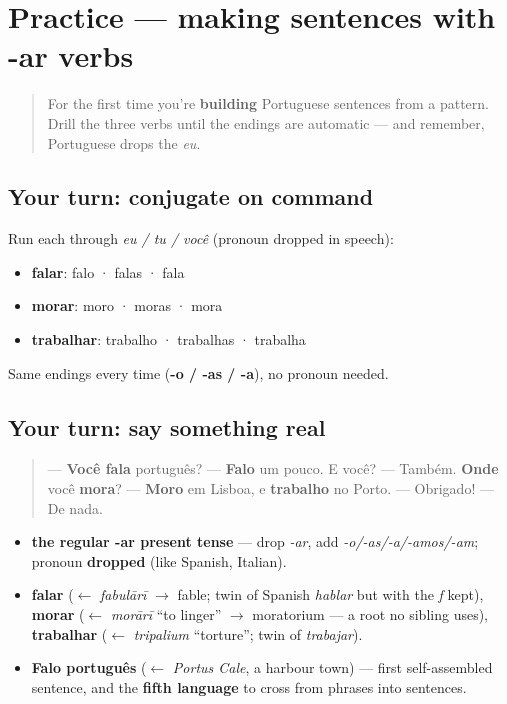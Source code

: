 \section[Practice]{Practice — making sentences with -ar verbs}

\label{lesson:PT-C05-practice}



\begin{quote}
For the first time you're \textbf{building} Portuguese sentences from a pattern. Drill the three verbs until the endings are automatic — and remember, Portuguese drops the \emph{eu}.
\end{quote}

\subsection*{Your turn: conjugate on command}
Run each through \emph{eu / tu / você} (pronoun dropped in speech):

\begin{itemize}
\raggedright
  \item \textbf{falar}: falo · falas · fala
  \item \textbf{morar}: moro · moras · mora
  \item \textbf{trabalhar}: trabalho · trabalhas · trabalha
\end{itemize}

Same endings every time (\textbf{-o / -as / -a}), no pronoun needed.

\subsection*{Your turn: say something real}
\begin{quote}
— \textbf{Você fala} português? — \textbf{Falo} um pouco. E você? — Também. \textbf{Onde} você \textbf{mora}? — \textbf{Moro} em Lisboa, e \textbf{trabalho} no Porto. — Obrigado! — De nada.
\end{quote}

\begin{grammarlens}[title={What you've built this chapter}]
\begin{itemize}
\raggedright
  \item \textbf{the regular -ar present tense} — drop \emph{-ar}, add \emph{-o/-as/-a/-amos/-am}; pronoun \textbf{dropped} (like Spanish, Italian).
  \item \textbf{falar} ($\leftarrow$ \emph{fabulārī} $\to$ fable; twin of Spanish \emph{hablar} but with the \emph{f} kept), \textbf{morar} ($\leftarrow$ \emph{morārī} \textquotedblleft{}to linger\textquotedblright{} $\to$ moratorium — a root no sibling uses), \textbf{trabalhar} ($\leftarrow$ \emph{tripalium} \textquotedblleft{}torture\textquotedblright{}; twin of \emph{trabajar}).
  \item \textbf{Falo português} ($\leftarrow$ \emph{Portus Cale}, a harbour town) — first self-assembled sentence, and the \textbf{fifth language} to cross from phrases into sentences.
\end{itemize}
\end{grammarlens}

